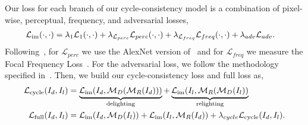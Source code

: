 Our loss for each branch of our cycle-consistency model is a combination of pixel-wise, perceptual, frequency, and adversarial losses,
\begin{align} 
	\mathcal{L}_\textrm{im} (\cdot, \cdot) &= \lambda_1\mathcal{L}_1 (\cdot, \cdot) +  \lambda_{\mathcal{L}_{perc}}\mathcal{L}_{perc} (\cdot, \cdot) + \lambda_{\mathcal{L}_{freq}}\mathcal{L}_{freq} (\cdot, \cdot)  + \lambda_{adv}\mathcal{L}_{adv}.
\end{align}
Following~\cite{rodriguezpardo2023UMat,rodriguez2023neubtf,garces2023towards}, for $\mathcal{L}_{perc}$ we use the AlexNet version of~\cite{zhang2018unreasonable} and for $\mathcal{L}_{freq}$ we measure the Focal Frequency Loss~\cite{jiang2021focal}. For the adversarial loss, we follow the methodology specified in~\cite{zhu2017unpaired}. Then, we build our cycle-consistency loss and full loss as,
\begin{align}
	\mathcal{L}_\textrm{cycle} (I_d, I_l) &= \underbrace{\mathcal{L}_\textrm{im}(I_d, \mathcal{M}_D(\mathcal{M}_R(I_d)))}_\text{delighting} + \underbrace{\mathcal{L}_\textrm{im}(I_l, \mathcal{M}_R(\mathcal{M}_D(I_l))}_\text{relighting}	\\
	\mathcal{L}_\textrm{full}  (I_d, I_l) &= \mathcal{L}_\textrm{im} (I_d, \mathcal{M}_D(I_{l}) ) +  \mathcal{L}_\textrm{im} (I_l, \mathcal{M}_R(I_{d}) )  + \lambda_{cycle}\mathcal{L}_{\textrm{cycle}} (I_d, I_l).
\end{align}



